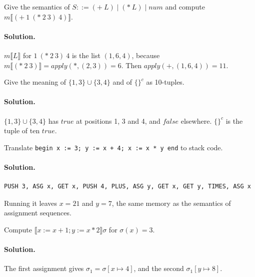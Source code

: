 \begin{exercise}
Give the semantics of $S ::= (+\ L) \mid (*\ L) \mid \mathit{num}$ and compute
$m\llbracket (+\ 1\ (*\ 2\ 3)\ 4) \rrbracket$.
\end{exercise}

\paragraph{Solution.} $m\llbracket L \rrbracket$ for $1\ (*\ 2\ 3)\ 4$ is the list $(1, 6, 4)$,
because $m\llbracket (*\ 2\ 3) \rrbracket = \mathit{apply}(*, (2, 3)) = 6$. Then
$\mathit{apply}(+, (1, 6, 4)) = 11$.

\begin{exercise}
Give the meaning of $\{1, 3\} \cup \{3, 4\}$ and of $\{\}^c$ as 10-tuples.
\end{exercise}

\paragraph{Solution.} $\{1, 3\} \cup \{3, 4\}$ has $\mathit{true}$ at positions 1, 3 and 4,
and $\mathit{false}$ elsewhere. $\{\}^c$ is the tuple of ten $\mathit{true}$.

\begin{exercise}
Translate \texttt{begin x := 3; y := x + 4; x := x * y end} to stack code.
\end{exercise}

\paragraph{Solution.}
\begin{lstlisting}
PUSH 3, ASG x, GET x, PUSH 4, PLUS, ASG y, GET x, GET y, TIMES, ASG x
\end{lstlisting}
Running it leaves $x = 21$ and $y = 7$, the same memory as
the semantics of assignment sequences.

\begin{exercise}
Compute $\llbracket x := x + 1 ; y := x * 2 \rrbracket\sigma$ for $\sigma(x) = 3$.
\end{exercise}

\paragraph{Solution.} The first assignment gives $\sigma_1 = \sigma[x \mapsto 4]$, and the
second $\sigma_1[y \mapsto 8]$.
